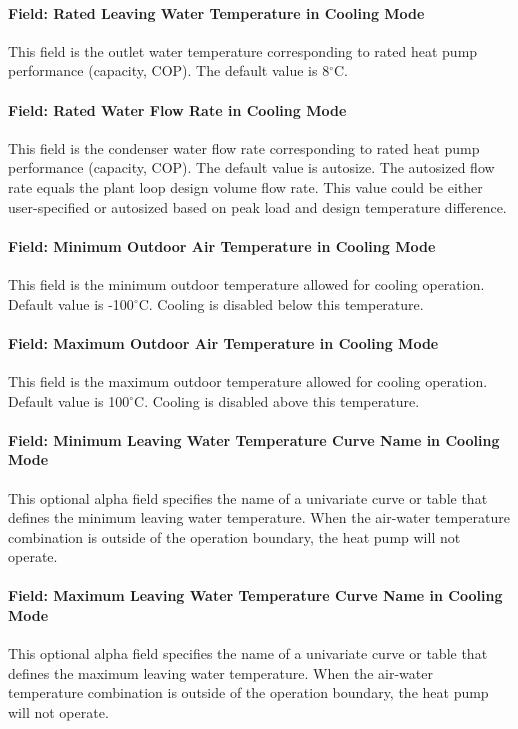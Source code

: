 \paragraph{Field: Rated Leaving Water Temperature in Cooling Mode} This field is
the outlet water temperature corresponding to rated heat pump performance
(capacity, COP). The default value is 8$^\circ$C.
\paragraph{Field: Rated Water Flow Rate in Cooling Mode} This field is the
condenser water flow rate corresponding to rated heat pump performance
(capacity, COP). The default value is autosize.
The autosized flow rate equals the plant loop design volume flow rate.
This value could be either user-specified or autosized based on peak load and design
temperature difference.
\paragraph{Field: Minimum Outdoor Air Temperature in Cooling Mode} This field is
the minimum outdoor temperature allowed for cooling operation. Default value is
-100$^\circ$C. Cooling is disabled below this temperature.
\paragraph{Field: Maximum Outdoor Air Temperature in Cooling Mode} This field is
the maximum outdoor temperature allowed for cooling operation. Default value is
100$^\circ$C. Cooling is disabled above this temperature.
\paragraph{Field: Minimum Leaving Water Temperature Curve Name in Cooling Mode}
This optional alpha field specifies the name of a univariate curve or table that defines
the minimum leaving water temperature. When the air-water temperature combination is outside of
the operation boundary, the heat pump will not operate.
\paragraph{Field: Maximum Leaving Water Temperature Curve Name in Cooling Mode}
This optional alpha field specifies the name of a univariate curve or table that defines
the maximum leaving water temperature. When the air-water temperature combination is outside of
the operation boundary, the heat pump will not operate.
